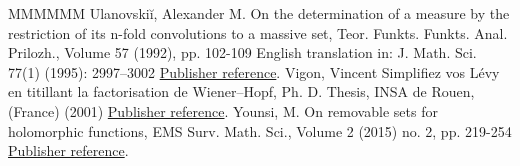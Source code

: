 \documentclass[11pt]{article}
\theoremstyle{definition}
\numberwithin{equation}{section}
\numberwithin{figure}{section}
\numberwithin{table}{section}
\begin{document}
\begin{thebibliography}{MMMMMM}
 Ulanovskiĭ, Alexander M. On the determination of a measure by the restriction of its n-fold convolutions to a massive set, Teor. Funkts. Funkts. Anal. Prilozh., Volume 57 (1992), pp. 102-109 English translation in: J. Math. Sci. 77(1) (1995): 2997–3002 \href{https://ahl.centre-mersenne.org/item/AHL_2020__3__1389_0/#bib:u94}{Publisher reference}.
 Vigon, Vincent Simplifiez vos Lévy en titillant la factorisation de Wiener–Hopf, Ph. D. Thesis, INSA de Rouen, (France) (2001) \href{https://ahl.centre-mersenne.org/item/AHL_2020__3__1389_0/#bib:v02}{Publisher reference}.
 Younsi, M. On removable sets for holomorphic functions, EMS Surv. Math. Sci., Volume 2 (2015) no. 2, pp. 219-254 \href{https://ahl.centre-mersenne.org/item/AHL_2020__3__1389_0/#bib:y15}{Publisher reference}.
\end{thebibliography}
\end{document}

